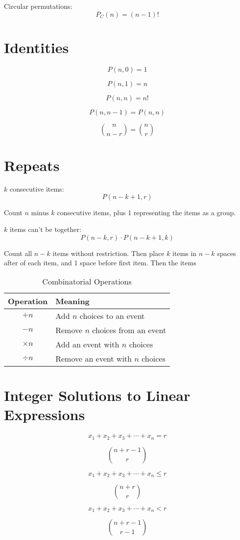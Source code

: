 \documentclass{article}
\begin{document}
    Circular permutations: \begin{equation}
        P_C(n) = (n - 1)!
    \end{equation}

    \section{Identities}

    $$P(n, 0) = 1$$

    $$P(n, 1) = n$$

    $$P(n, n) = n!$$
    
    $$P(n, n - 1) = P(n, n)$$
    
    $${n \choose n - r} = {n \choose r}$$

    \section{Repeats}

    $k$ consecutive items: \begin{equation}
        P(n - k + 1, r)
    \end{equation}

    Count $n$ minus $k$ consecutive items, plus 1 representing the items as a group.

    $k$ items can't be together: \begin{equation}
        P(n - k, r) \cdot P(n - k + 1, k)
    \end{equation}

    Count all $n - k$ items without restriction. Then place $k$ items in $n - k$ spaces after of each item, and 1 space before first item. Then the items

    \begin{table}[h]
        \caption{Combinatorial Operations}
        \centering
        \begin{tabular}{cl}
            \toprule
            Operation & Meaning \\
            \midrule
            $+ n$ & Add $n$ choices to an event \\
            $- n$ & Remove $n$ choices from an event \\
            $\times n$ & Add an event with $n$ choices \\
            $\div n$ & Remove an event with $n$ choices \\
            \bottomrule
        \end{tabular}
    \end{table}

    \section{Integer Solutions to Linear Expressions}

    $$x_1 + x_2 + x_3 + \cdots + x_n = r$$
    
    $${n + r - 1 \choose r}$$

    $$x_1 + x_2 + x_3 + \cdots + x_n \leq r$$
    
    $${n + r \choose r}$$

    $$x_1 + x_2 + x_3 + \cdots + x_n < r$$
    
    $${n + r - 1 \choose r - 1}$$
\end{document}
